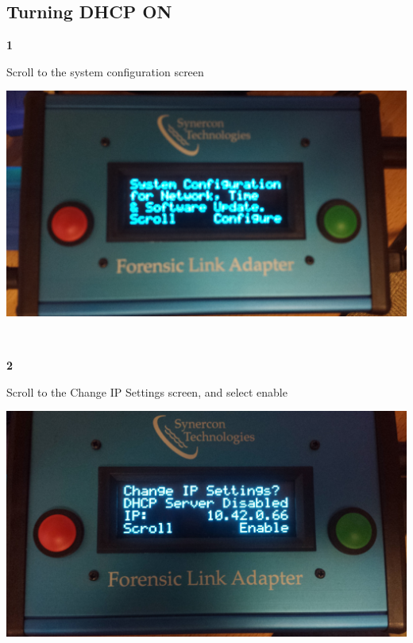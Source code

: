 \documentclass[11pt, oneside]{book}
\begin{document}
\subsection{Turning DHCP ON}
\noindent\begin{minipage}{0.45\textwidth}%
\begin{center}
\textbf{1}\\[\baselineskip]
\end{center}
Scroll to the system configuration screen
\end{minipage}%
\hfill%
\begin{minipage}{0.45\textwidth}
\includegraphics[width=\linewidth]{../media/fla_screens/sys_conf}
\end{minipage}
\\[\baselineskip]
\noindent\begin{minipage}{0.45\textwidth}%
\begin{center}
\textbf{2}\\[\baselineskip]
\end{center}
Scroll to the Change IP Settings screen, and select enable
\end{minipage}%
\hfill%
\begin{minipage}{0.45\textwidth}
\includegraphics[width=\linewidth]{../media/fla_screens/sys_conf_dhcp_diss}
\end{minipage}
\end{document}
